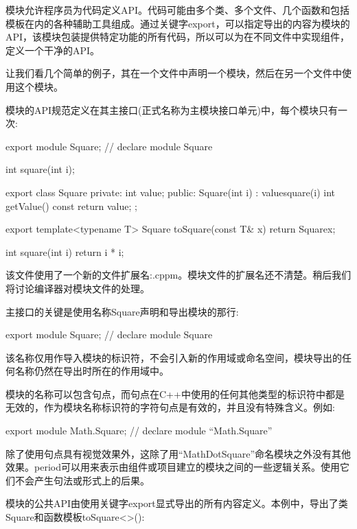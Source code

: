 
模块允许程序员为代码定义API。代码可能由多个类、多个文件、几个函数和包括模板在内的各种辅助工具组成。通过关键字export，可以指定导出的内容为模块的API，该模块包装提供特定功能的所有代码，所以可以为在不同文件中实现组件，定义一个干净的API。

让我们看几个简单的例子，其在一个文件中声明一个模块，然后在另一个文件中使用这个模块。


模块的API规范定义在其主接口(正式名称为主模块接口单元)中，每个模块只有一次:


\begin{cpp}
export module Square; // declare module Square

int square(int i);

export class Square {
private:
	int value;
public:
	Square(int i)
	: value{square(i)} {
	}
	int getValue() const {
		return value;
	}
};

export template<typename T>
Square toSquare(const T& x) {
	return Square{x};
}

int square(int i) {
	return i * i;
}
\end{cpp}

该文件使用了一个新的文件扩展名:.cppm。模块文件的扩展名还不清楚。稍后我们将讨论编译器对模块文件的处理。

主接口的关键是使用名称Square声明和导出模块的那行:

\begin{cpp}
export module Square; // declare module Square
\end{cpp}

该名称仅用作导入模块的标识符，不会引入新的作用域或命名空间，模块导出的任何名称仍然在导出时所在的作用域中。

模块的名称可以包含句点，而句点在C++中使用的任何其他类型的标识符中都是无效的，作为模块名称标识符的字符句点是有效的，并且没有特殊含义。例如:

\begin{cpp}
export module Math.Square; // declare module “Math.Square”
\end{cpp}

除了使用句点具有视觉效果外，这除了用“MathDotSquare”命名模块之外没有其他效果。period可以用来表示由组件或项目建立的模块之间的一些逻辑关系。使用它们不会产生句法或形式上的后果。

模块的公共API由使用关键字export显式导出的所有内容定义。本例中，导出了类Square和函数模板toSquare<>():

